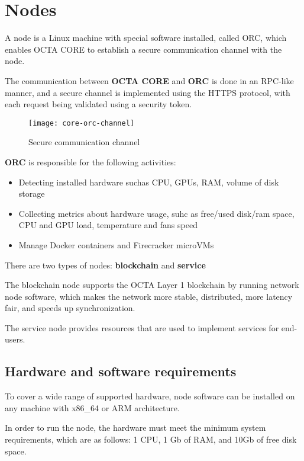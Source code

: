 \section{Nodes}

A node is a Linux machine with special software installed, called ORC, which enables OCTA CORE to establish a secure communication channel with the node.

The communication between \textbf{OCTA CORE} and \textbf{ORC} is done in an RPC\cite{rpc}-like manner,
and a secure channel is implemented using the HTTPS\cite{https} protocol, with each request being validated using a security token.

\begin{figure}[H]
    \centering
    \texttt{[image: core-orc-channel]}
    \caption{Secure communication channel}
\end{figure}

\textbf{ORC} is responsible for the following activities:

\begin{itemize}
    \item Detecting installed hardware suchas CPU, GPUs, RAM, volume of disk storage
    \item Collecting metrics about hardware usage, suhc as free/used disk/ram space, CPU and GPU load, temperature and fans speed
    \item Manage Docker\cite{docker} containers and Firecracker\cite{firecracker} microVMs
\end{itemize}

There are two types of nodes: \textbf{blockchain} and \textbf{service}

The blockchain node supports the OCTA Layer 1 blockchain by running network node software, which makes the network more stable, distributed, more latency fair, and speeds up synchronization.

The service node provides resources that are used to implement services for end-users.

\subsection{Hardware and software requirements}

To cover a wide range of supported hardware, node software can be installed on any machine with x86\_64\cite{x86_64} or ARM\cite{arm} architecture.

In order to run the node, the hardware must meet the minimum system requirements, which are as follows: 1 CPU, 1 Gb of RAM, and 10Gb of free disk space.

